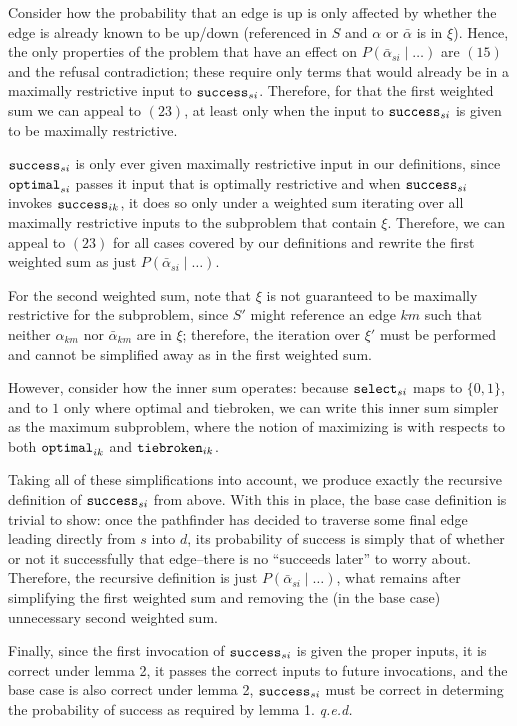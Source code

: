 \documentclass{article}
\begin{document}
Consider how the probability that an edge is up is only affected by
whether the edge is already known to be up/down (referenced in $S$ and
$\alpha$ or $\bar \alpha$ is in $\xi$). Hence, the only properties of
the problem that have an effect on $P(\bar \alpha_{si} \mid \dots)$ are
$(15)$ and the refusal contradiction; these require only terms that
would already be in a maximally restrictive input to
${\tt success}_{si}$. Therefore, for that the first weighted sum we can
appeal to $(23)$, at least only when the input to ${\tt success}_{si}$
is given to be maximally restrictive.

${\tt success}_{si}$ is only ever given maximally restrictive input in
our definitions, since ${\tt optimal}_{si}$ passes it input that is
optimally restrictive and when ${\tt success}_{si}$ invokes
${\tt success}_{ik}$, it does so only under a weighted sum iterating
over all maximally restrictive inputs to the subproblem that contain
$\xi$. Therefore, we can appeal to $(23)$ for all cases covered by our
definitions and rewrite the first weighted sum as just
$P(\bar \alpha_{si} \mid \dots)$.

For the second weighted sum, note that $\xi$ is not guaranteed to be
maximally restrictive for the subproblem, since $S'$ might reference an
edge $km$ such that neither $\alpha_{km}$ nor $\bar \alpha_{km}$ are in
$\xi$; therefore, the iteration over $\xi'$ must be performed and cannot
be simplified away as in the first weighted sum.

However, consider how the inner sum operates: because
${\tt select}_{si}$ maps to $\{0, 1\}$, and to $1$ only where optimal
and tiebroken, we can write this inner sum simpler as the maximum
subproblem, where the notion of maximizing is with respects to both
${\tt optimal}_{ik}$ and ${\tt tiebroken}_{ik}$.

Taking all of these simplifications into account, we produce exactly the
recursive definition of ${\tt success}_{si}$ from above. With this in
place, the base case definition is trivial to show: once the pathfinder
has decided to traverse some final edge leading directly from $s$ into
$d$, its probability of success is simply that of whether or not it
successfully that edge--there is no ``succeeds later'' to worry about.
Therefore, the recursive definition is just
$P(\bar \alpha_{si} \mid \dots)$, what remains after simplifying the
first weighted sum and removing the (in the base case) unnecessary
second weighted sum.

Finally, since the first invocation of ${\tt success}_{si}$ is given the
proper inputs, it is correct under lemma 2, it passes the correct inputs
to future invocations, and the base case is also correct under lemma 2,
${\tt success}_{si}$ must be correct in determing the probability of
success as required by lemma 1. \emph{q.e.d.}
\end{document}
